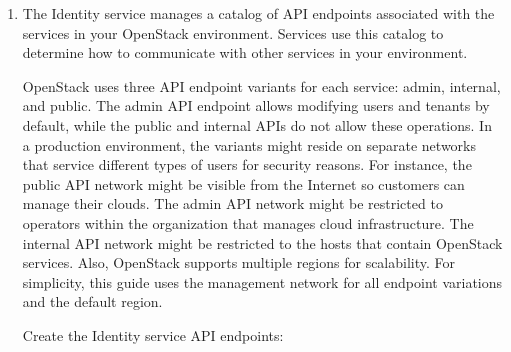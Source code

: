 \documentclass[letterpaper,10pt,english]{sphinxmanual}
\begin{document}
\begin{enumerate}
\begin{notice}{note}{Note:}
OpenStack generates IDs dynamically, so you will see different
values in the example command output.
\end{notice}

\item {} 
The Identity service manages a catalog of API endpoints associated with
the services in your OpenStack environment. Services use this catalog to
determine how to communicate with other services in your environment.

OpenStack uses three API endpoint variants for each service: admin,
internal, and public. The admin API endpoint allows modifying users and
tenants by default, while the public and internal APIs do not allow these
operations. In a production environment, the variants might reside on
separate networks that service different types of users for security
reasons. For instance, the public API network might be visible from the
Internet so customers can manage their clouds. The admin API network
might be restricted to operators within the organization that manages
cloud infrastructure. The internal API network might be restricted to
the hosts that contain OpenStack services. Also, OpenStack supports
multiple regions for scalability. For simplicity, this guide uses the
management network for all endpoint variations and the default
 region.

Create the Identity service API endpoints:


\end{enumerate}
\end{document}
